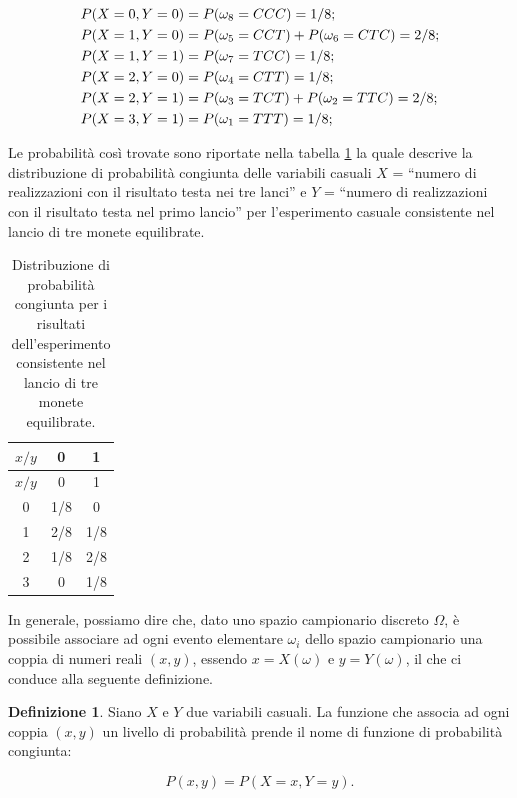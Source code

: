 \documentclass[
  11pt,
]{krantz}
\theoremstyle{definition}
\newtheorem{definition}{Definizione}[chapter]
\theoremstyle{definition}
\theoremstyle{definition}
\theoremstyle{definition}
\theoremstyle{remark}
\begin{document}
\begin{align}
P(X = 0, Y = 0) &= P(\omega_8 = CCC) = 1/8; \notag\\
P(X = 1, Y = 0) &= P(\omega_5 = CCT) + P(\omega_6 = CTC) = 2/8; \notag\\
P(X = 1, Y = 1) &= P(\omega_7 = TCC) = 1/8; \notag\\
P(X = 2, Y = 0) &= P(\omega_4 = CTT) = 1/8; \notag\\
P(X = 2, Y = 1) &= P(\omega_3 = TCT) + P(\omega_2 = TTC) = 2/8; \notag\\
P(X = 3, Y = 1) &= P(\omega_1 = TTT) = 1/8; \notag
\end{align}

Le probabilità così trovate sono riportate nella tabella \ref{tab:ditr-cong-biv-1} la quale descrive la distribuzione di probabilità congiunta delle variabili casuali \(X\) = ``numero di realizzazioni con il risultato testa nei tre lanci'' e \(Y\) = ``numero di realizzazioni con il risultato testa nel primo lancio'' per l'esperimento casuale consistente nel lancio di tre monete equilibrate.

\begin{longtable}[]{@{}ccc@{}}
\caption{\label{tab:ditr-cong-biv-1} Distribuzione di probabilità congiunta per i risultati dell'esperimento consistente nel lancio di tre monete equilibrate.}\tabularnewline
\toprule
\(x / y\) & 0 & 1 \\
\midrule
\endfirsthead
\toprule
\(x / y\) & 0 & 1 \\
\midrule
\endhead
0 & 1/8 & 0 \\
1 & 2/8 & 1/8 \\
2 & 1/8 & 2/8 \\
3 & 0 & 1/8 \\
\bottomrule
\end{longtable}

In generale, possiamo dire che, dato uno spazio campionario discreto \(\Omega\), è possibile associare ad ogni evento elementare \(\omega_i\) dello spazio campionario una coppia di numeri reali \((x, y)\), essendo \(x = X(\omega)\) e \(y = Y(\omega)\), il che ci conduce alla seguente definizione.

\begin{definition}
Siano \(X\) e \(Y\) due variabili casuali. La funzione che associa ad ogni coppia \((x, y)\) un livello di probabilità prende il nome di funzione di probabilità congiunta:

\[
P(x, y) = P(X = x, Y = y).
\]
\end{definition}
\end{document}

